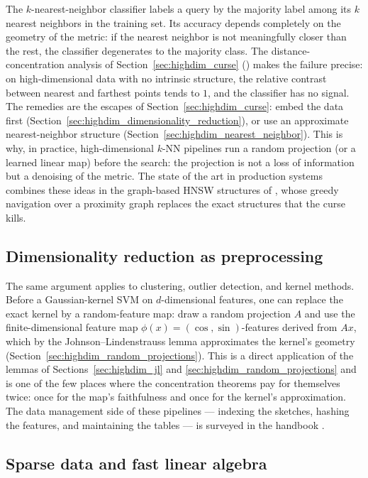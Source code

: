 The $k$-nearest-neighbor classifier labels a query by the majority label among
its $k$ nearest neighbors in the training set. Its accuracy depends
completely on the geometry of the metric: if the nearest neighbor is not
meaningfully closer than the rest, the classifier degenerates to the majority
class. The distance-concentration analysis of Section~\ref{sec:highdim_curse}
(\cite{beyer1999}) makes the failure precise: on high-dimensional data with no
intrinsic structure, the relative contrast between nearest and farthest points
tends to $1$, and the classifier has no signal. The remedies are the escapes
of Section~\ref{sec:highdim_curse}: embed the data first
(Section~\ref{sec:highdim_dimensionality_reduction}), or use an approximate
nearest-neighbor structure (Section~\ref{sec:highdim_nearest_neighbor}).
This is why, in practice, high-dimensional $k$-NN pipelines run a random
projection (or a learned linear map) before the search: the projection is not
a loss of information but a denoising of the metric. The state of the art in
production systems combines these ideas in the graph-based HNSW structures of
\cite{malkov2018}, whose greedy navigation over a proximity graph replaces the
exact structures that the curse kills.

\subsection{Dimensionality reduction as preprocessing}

The same argument applies to clustering, outlier detection, and kernel
methods. Before a Gaussian-kernel SVM on $d$-dimensional features, one can
replace the exact kernel by a random-feature map: draw a random projection
$A$ and use the finite-dimensional feature map
$\phi(x) = (\cos, \sin)$-features derived from $A x$, which by the 
Johnson--Lindenstrauss lemma approximates the kernel's geometry
(Section~\ref{sec:highdim_random_projections}). This is a direct application
of the lemmas of Sections~\ref{sec:highdim_jl} and
\ref{sec:highdim_random_projections} and is one of the few places where the
concentration theorems pay for themselves twice: once for the map's
faithfulness and once for the kernel's approximation. The data management side
of these pipelines --- indexing the sketches, hashing the features, and
maintaining the tables --- is surveyed in the handbook \cite{mehta2006}.

\subsection{Sparse data and fast linear algebra}

